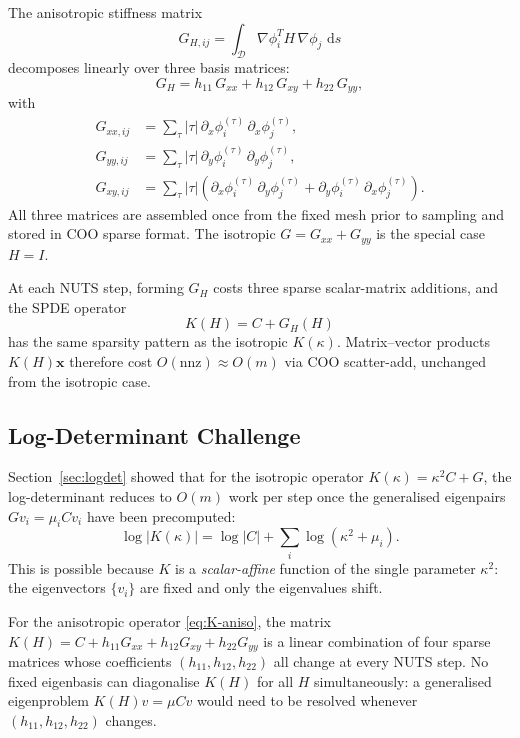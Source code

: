 \documentclass[11pt]{article}
\newcommand{\dd}{\,\mathrm{d}}
\newcommand{\bx}{\mathbf{x}}
\begin{document}
The anisotropic stiffness matrix
\[
G_{H,ij} = \int_\mathcal{D} \nabla\phi_i^T H\,\nabla\phi_j\,\dd s
\]
decomposes linearly over three basis matrices:
\begin{equation}
  G_H = h_{11}\,G_{xx} + h_{12}\,G_{xy} + h_{22}\,G_{yy},
  \label{eq:GH-decomp}
\end{equation}
with
\begin{align}
  G_{xx,ij} &= \sum_\tau |\tau|\,
    \partial_x\phi_i^{(\tau)}\,\partial_x\phi_j^{(\tau)}, \\
  G_{yy,ij} &= \sum_\tau |\tau|\,
    \partial_y\phi_i^{(\tau)}\,\partial_y\phi_j^{(\tau)}, \\
  G_{xy,ij} &= \sum_\tau |\tau|\!\left(
    \partial_x\phi_i^{(\tau)}\,\partial_y\phi_j^{(\tau)}
    + \partial_y\phi_i^{(\tau)}\,\partial_x\phi_j^{(\tau)}\right).
\end{align}
All three matrices are assembled once from the fixed mesh prior to sampling and
stored in COO sparse format.  The isotropic $G = G_{xx} + G_{yy}$ is the
special case $H = I$.

At each NUTS step, forming $G_H$ costs three sparse scalar-matrix additions, and
the SPDE operator
\begin{equation}
  K(H) = C + G_H(H)
  \label{eq:K-aniso}
\end{equation}
has the same sparsity pattern as the isotropic $K(\kappa)$.  Matrix--vector
products $K(H)\bx$ therefore cost $O(\mathrm{nnz}) \approx O(m)$ via COO
scatter-add, unchanged from the isotropic case.

\subsection{Log-Determinant Challenge}
\label{sec:logdet-aniso}

Section~\ref{sec:logdet} showed that for the isotropic operator $K(\kappa) =
\kappa^2 C + G$, the log-determinant reduces to $O(m)$ work per step once the
generalised eigenpairs $G v_i = \mu_i C v_i$ have been precomputed:
\[
  \log|K(\kappa)| = \log|C| + \textstyle\sum_i \log(\kappa^2 + \mu_i).
\]
This is possible because $K$ is a \emph{scalar-affine} function of the single
parameter $\kappa^2$: the eigenvectors $\{v_i\}$ are fixed and only the
eigenvalues shift.

For the anisotropic operator \eqref{eq:K-aniso}, the matrix
$K(H) = C + h_{11}G_{xx} + h_{12}G_{xy} + h_{22}G_{yy}$
is a linear combination of four sparse matrices whose coefficients
$(h_{11}, h_{12}, h_{22})$ all change at every NUTS step.  No fixed eigenbasis
can diagonalise $K(H)$ for all $H$ simultaneously: a generalised eigenproblem
$K(H) v = \mu C v$ would need to be resolved whenever $(h_{11}, h_{12}, h_{22})$
changes.
\end{document}

